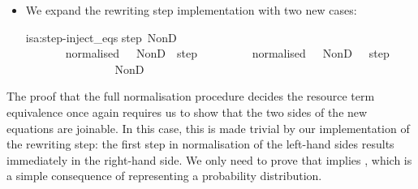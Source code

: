 \documentclass[class=smolathesis,crop=false]{standalone}
\begin{document}
\begin{itemize}
  \item We expand the rewriting step implementation with two new cases:
    \begin{isadef}{isa:step-inject_eqs}
      {\isachardoublequoteopen}step\ {\isacharparenleft}NonD\ \ \ \ {\isacharequal}\isanewline
      \ \ {\isacharparenleft}\ \ \ \ \isanewline
      \ \ \ \ \ \ \ \ \isanewline
      \ \ \ \ \ \ {\isasymnot}\ normalised\ \ \ NonD\ \ {\isacharparenleft}step\ \ \isanewline
      \ \ \ \ \ \ {\isasymnot}\ normalised\ \ \ NonD\ \ \ {\isacharparenleft}step\ \isanewline
      \ \ \ \ \ \ \ \isacharequal\ \ \ \isanewline
      \ \ \ \ \ NonD\ \ \ 
    \end{isadef}
\end{itemize}

The proof that the full normalisation procedure  decides the resource term equivalence once again requires us to show that the two sides of the new equations are joinable.
In this case, this is made trivial by our implementation of the rewriting step: the first step in normalisation of the left-hand sides results immediately in the right-hand side.
We only need to prove that  implies , which is a simple consequence of  representing a probability distribution.
\end{document}
